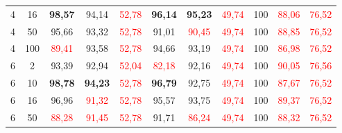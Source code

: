 \begin{table}[ht]
\begin{tabular}{cc|ccc|ccc|ccc}
        {4}                           & {16}    & \textbf{98,57}                      & {94,14}                             & \textcolor{red}{52,78}                   & \textbf{96,14}                  & \textbf{95,23}                  & \textcolor{red}{49,74}         & {100}                           & \textcolor{red}{88,06}          & \textcolor{red}{76,52}         \\
        {4}                           & {50}    & {95,66}                             & {93,32}                             & \textcolor{red}{52,78}                   & {91,01}                         & \textcolor{red}{90,45}          & \textcolor{red}{49,74}         & {100}                           & \textcolor{red}{88,85}          & \textcolor{red}{76,52}         \\
        {4}                           & {100}   & \textcolor{red}{89,41}              & {93,58}                             & \textcolor{red}{52,78}                   & {94,66}                         & {93,19}                         & \textcolor{red}{49,74}         & {100}                           & \textcolor{red}{86,98}          & \textcolor{red}{76,52}         \\
        {6}                           & {2}     & {93,39}                             & {92,94}                             & \textcolor{red}{52,04}                   & \textcolor{red}{82,18}          & {92,16}                         & \textcolor{red}{49,74}         & {100}                           & \textcolor{red}{90,05}          & \textcolor{red}{76,56}         \\
        {6}                           & {10}    & \textbf{98,78}                      & \textbf{94,23}                      & \textcolor{red}{52,78}                   & \textbf{96,79}                  & {92,75}                         & \textcolor{red}{49,74}         & {100}                           & \textcolor{red}{87,67}          & \textcolor{red}{76,52}         \\
        {6}                           & {16}    & {96,96}                             & \textcolor{red}{91,32}              & \textcolor{red}{52,78}                   & {95,57}                         & {93,75}                         & \textcolor{red}{49,74}         & {100}                           & \textcolor{red}{89,37}          & \textcolor{red}{76,52}         \\
        {6}                           & {50}    & \textcolor{red}{88,28}              & \textcolor{red}{91,45}              & \textcolor{red}{52,78}                   & {91,71}                         & \textcolor{red}{86,24}          & \textcolor{red}{49,74}         & {100}                           & \textcolor{red}{88,32}          & \textcolor{red}{76,52}         \\

\end{tabular}
\end{table}
